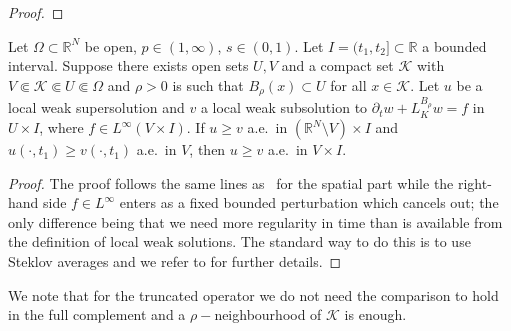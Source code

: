 \documentclass[11pt, a4paper, twoside]{article}
\theoremstyle{definition}
\theoremstyle{remark}
\newcommand{\R}{\mathbb{R}}
\begin{document}
\begin{proof}

\end{proof}
\begin{lemma}
\label{lem:parabolic-comparison}
Let $\Omega \subset \R^N$ be open, $p \in (1,\infty)$,
$s \in (0,1)$. Let $I = (t_1,t_2]\subset \R$ a bounded interval. Suppose there exists
open sets $U,V$ and a compact set $\mathcal{K}$ with $V \Subset \mathcal{K} \Subset U \Subset \Omega$ and $\rho > 0$ is such that
$B_\rho(x) \subset U$ for all $x \in \mathcal{K}$.
Let $u$ be a local weak supersolution and $v$ a local
weak subsolution to
$\partial_t w + L_K^{B_\rho} w = f$ in
$U \times I$, where $f \in L^\infty(V \times I)$. If
$u \ge v$ a.e.\ in
$(\R^N \setminus V) \times I$ and
$u(\cdot,t_1) \ge v(\cdot,t_1)$ a.e.\ in $V$,
then $u \ge v$ a.e.\ in $V\times I$.
\end{lemma}

\begin{proof}
The proof follows the same lines
as~\cite{KorvenpaaKuusiPalatucci2017Perron} for the spatial part while the right-hand side $f \in L^\infty$
enters as a fixed bounded perturbation which cancels out; the only difference being 
that we need more regularity in time than is available from the definition of local weak solutions. 
The standard way to do this is to use Steklov averages and we refer to \cite[Appendix B]{
Liao2024HolderParabolicFracPLap} for further details. 
\end{proof}
\begin{remark}
    We note that for the truncated operator we do not need the comparison to hold in the full complement and a $\rho-$neighbourhood of $\mathcal{K}$ is enough.  
\end{remark}
\end{document}
